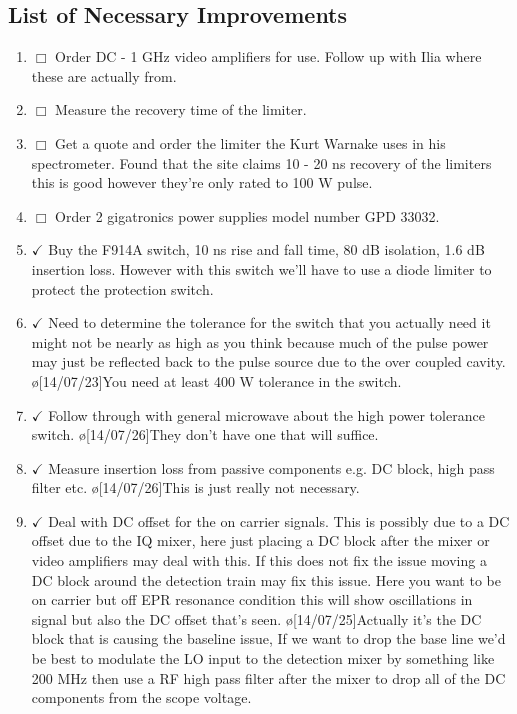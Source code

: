 \documentclass[10pt]{book}
\begin{document}
\subsection{List of Necessary Improvements}
\begin{enumerate}
    \item $\Box$ Order DC - 1 GHz video amplifiers for use. Follow up with Ilia where these are actually from. 
    \item $\Box$ Measure the recovery time of the limiter.
    \item $\Box$ Get a quote and order the limiter the Kurt Warnake uses in his spectrometer. Found that the site claims 10 - 20 ns recovery of the limiters this is good however they're only rated to 100 W pulse.
    \item $\Box$ Order 2 gigatronics power supplies model number GPD 33032.
	\item $\checkmark$ Buy the F914A switch, 10 ns rise and fall time, 80 dB isolation, 1.6 dB insertion loss. However with this switch we'll have to use a diode limiter to protect the protection switch. 
    \item $\checkmark$ Need to determine the tolerance for the switch that you actually need it might not be nearly as high as you think because much of the pulse power may just be reflected back to the pulse source due to the over coupled cavity. \o[14/07/23]{You need at least 400 W tolerance in the switch.}
    \item $\checkmark$ Follow through with general microwave about the high power tolerance switch. \o[14/07/26]{They don't have one that will suffice.}
    \item $\checkmark$ Measure insertion loss from passive components e.g. DC block, high pass filter etc. \o[14/07/26]{This is just really not necessary.}
    \item $\checkmark$ Deal with DC offset for the on carrier signals. This is possibly due to a DC offset due to the IQ mixer, here just placing a DC block after the mixer or video amplifiers may deal with this. If this does not fix the issue moving a DC block around the detection train may fix this issue. Here you want to be on carrier but off EPR resonance condition this will show oscillations in signal but also the DC offset that's seen.  \o[14/07/25]{Actually it's the DC block that is causing the baseline issue, If we want to drop the base line we'd be best to modulate the LO input to the detection mixer by something like 200 MHz then use a RF high pass filter after the mixer to drop all of the DC components from the scope voltage.}

\end{enumerate}
\end{document}
